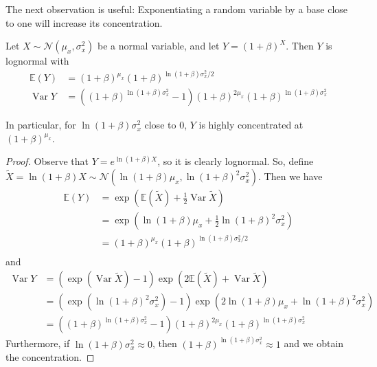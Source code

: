 \documentclass[final,12pt]{colt2022} %
\newcommand{\E}{\mathbb{E}}
\DeclareMathOperator{\var}{Var}
\begin{document}
\noindent The next observation is useful: Exponentiating a random variable by a base close to one will increase its concentration.
\begin{lemma} \label{lemma:lognormal}
Let $X \sim \mathcal N(\mu_x, \sigma_x^2)$ be a normal variable, and let $Y = (1 + \beta)^X$. Then $Y$ is lognormal with \begin{align*}
    \E(Y) &= (1+\beta)^{\mu_x}(1+\beta)^{\ln(1+\beta)\sigma_x^2/2}\\
    \var{Y} &= ((1+\beta)^{\ln(1+\beta)\sigma_x^2} - 1)(1+\beta)^{2\mu_x}(1+\beta)^{\ln(1+\beta)\sigma_x^2}
\end{align*} 
\end{lemma}
In particular, for $\ln(1+\beta)\sigma_x^2$ close to $0$, $Y$ is highly concentrated at $(1+\beta)^{\mu_x}$.
\begin{proof}
Observe that $Y = e^{\ln(1+\beta)X}$, so it is clearly lognormal. So, define $\tilde X = \ln(1+\beta)X \sim \mathcal N(\ln(1+\beta)\mu_x, \ln(1+\beta)^2\sigma_x^2)$. Then we have \begin{align*}
    \E(Y) &= \exp\left(\E(\tilde X) + \frac{1}{2}\var{\tilde X}\right)\\
    &= \exp\left(\ln(1+\beta)\mu_x + \frac{1}{2}\ln(1+\beta)^2\sigma_x^2\right)\\
    &= (1+\beta)^{\mu_x}(1+\beta)^{\ln(1+\beta)\sigma_x^2/2}\\
\end{align*} and \begin{align*}
    \var{Y} &= \left(\exp\left(\var{\tilde X}\right) - 1\right)\exp\left(2\E(\tilde X) + \var{\tilde X}\right)\\
    &= \left(\exp\left(\ln(1+\beta)^2\sigma_x^2\right) - 1\right)\exp\left(2\ln(1+\beta)\mu_x + \ln(1+\beta)^2\sigma_x^2\right)\\
    &= ((1+\beta)^{\ln(1+\beta)\sigma_x^2} - 1)(1+\beta)^{2\mu_x}(1+\beta)^{\ln(1+\beta)\sigma_x^2}
\end{align*} Furthermore, if $\ln(1+\beta)\sigma_x^2 \approx 0$, then $(1+\beta)^{\ln(1+\beta)\sigma_x^2} \approx 1$ and we obtain the concentration.
\end{proof}
\end{document}
